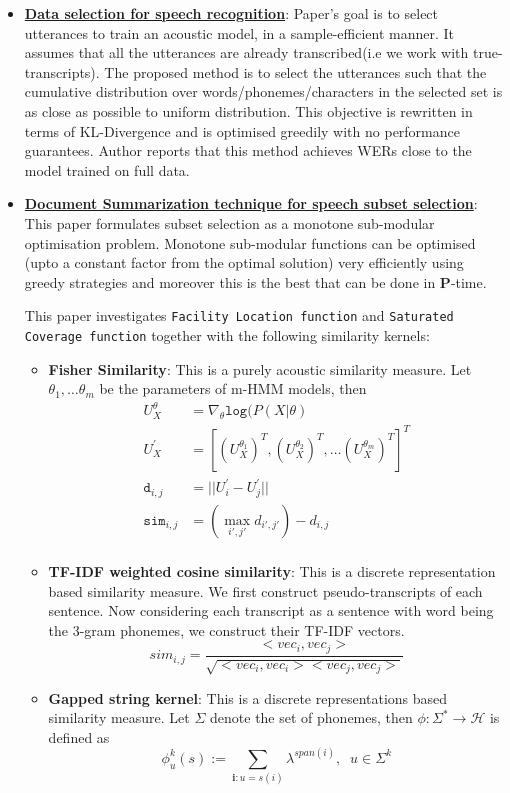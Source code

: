 \documentclass[12pt, a4paper, twoside]{article}
\begin{document}
\begin{itemize}
    \item \underline{\textbf{Data selection for speech recognition}}\cite{wu2007data}: Paper's goal is to select utterances to train an acoustic model, in a sample-efficient manner. It assumes that all the utterances are already transcribed(i.e we work with true-transcripts).
    The proposed method is to select the utterances such that the cumulative distribution over words/phonemes/characters in the selected set is as close as possible to uniform distribution. This objective is rewritten in terms of KL-Divergence and is optimised greedily with no performance guarantees. Author reports that this method achieves WERs close to the model trained on full data.
    
    \item \underline{\textbf{Document Summarization technique for speech subset selection}}: \cite{wei2013using} \\
    This paper formulates subset selection as a monotone sub-modular optimisation problem. Monotone sub-modular functions can be optimised (upto a constant factor from the optimal solution) very efficiently using greedy strategies and moreover this is the best that can be done in $\mathbf{P}$-time. 
    
    This paper investigates \texttt{Facility Location function} and \texttt{Saturated Coverage function} together with the following similarity kernels:
    \begin{itemize} 
        \item \textbf{Fisher Similarity}: This is a purely acoustic similarity measure. Let $\theta_1, \ldots \theta_m$ be the parameters of m-HMM models, then
        \begin{align*}
            U^{\theta}_{X} &= \nabla_{\theta} \mathtt{log}(P(X|\theta) \\
            U^{'}_{X} &= [(U^{\theta_1}_{X})^T, (U^{\theta_2}_{X})^T, \ldots  (U^{\theta_m}_{X})^T]^T \\
            \mathtt{d}_{i,j } &= || U^{'}_i -  U^{'}_j|| \\
            \mathtt{sim}_{i,j} &= (\max_{i', j'} d_{i', j'}) - d_{i,j} \\
        \end{align*}
        \vspace{-1.5cm}
        \item \textbf{TF-IDF weighted cosine similarity}: This is a discrete representation based similarity measure. We first construct pseudo-transcripts of each sentence. Now considering each transcript as a sentence with word being the 3-gram phonemes, we construct their TF-IDF vectors.
        $$sim_{i,j} = \frac{<vec_i, vec_j>}{\sqrt{<vec_i, vec_i> <vec_j, vec_j>}}$$
        \item \textbf{Gapped string kernel}\label{Gapped String Kernel}: This is a discrete representations based similarity measure. Let $\Sigma$ denote the set of phonemes, then $\phi: \Sigma^* \to \mathcal{H}$ is defined as 
        $$
            \phi^k_u(s) := \sum_{\mathbf{i}: u = s(i)} \lambda^{span(i)} , \;\; u \in \Sigma^k
        $$
        

\end{itemize}
\end{itemize}
\end{document}
